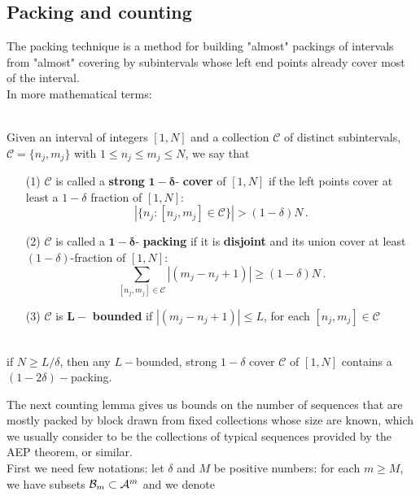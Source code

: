 \subsection{Packing and counting}
The packing technique is a method for building "almost" packings of intervals from "almost" covering by subintervals whose left end points already cover most of the interval. 
\\In more mathematical terms: 
\begin{definition}
    \hfill
    \\Given an interval of integers $[1, N]$ and a collection $\mathcal{C}$ of distinct subintervals, $\mathcal{C}= \{ n_j, m_j \}$ with $1 \leq n_j \leq m_j \leq N$, we say that
    \begin{itemize}
        \item[(1)] $\mathcal{C}$ is called a \textbf{strong} $\bm{1 - \delta}$- \textbf{cover} of $[1, N]$ if the left points cover at least a $1- \delta$ fraction of $[1, N]$:
        \begin{equation*}
            |\{ n_j : [n_j, m_j] \in \mathcal{C} \}| > (1 - \delta)N \,.
        \end{equation*}
        \item[(2)] $\mathcal{C}$ is called a $\bm{1 - \delta}$- \textbf{packing} if it is \textbf{disjoint} and its union cover at least $(1 - \delta)$-fraction of $[1,N]$:
        \begin{equation*}
            \sum_{[n_j, m_j] \in \mathcal{C}} |(m_j - n_j + 1)| \geq (1 - \delta)N \, .
        \end{equation*}
        \item[(3)] $\mathcal{C}$ is $\bm{L-}$ \textbf{bounded}  if $|(m_j - n_j +1 )| \leq L$, for each $[n_j, m_j] \in \mathcal{C}$
    \end{itemize}
\end{definition}
\begin{lemma}
\hfill\\
    if $N \geq L/\delta$, then any $L-$bounded, strong $1-\delta$ cover $\mathcal{C}$ of $[1,N]$ contains a $(1- 2\delta)-$packing.
\end{lemma}
The next counting lemma gives us bounds on the number of sequences that are mostly packed by block drawn from fixed collections whose size are known, which we usually consider to be the collections of typical sequences provided by the AEP theorem, or similar.
\\First we need few notations: let $\delta$ and $M$ be positive numbers: for each $m \geq M$, we have subsets $\mathcal{B}_m \subset \mathcal{A}^m$ and we denote 
